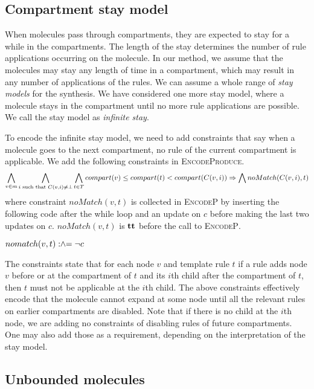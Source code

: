\subsection{Compartment stay model}

When molecules pass through compartments, they are expected to stay
for a while in the compartments.
%
The length of the stay determines the number of rule applications
occurring on the molecule.
%
In our method, we assume that the molecules may stay any length of time
in a compartment, which may result in any number of applications of the rules.
%
%
We can assume a whole range of {\em stay models} for the synthesis.
%
We have considered one more stay model, where a molecule stays
in the compartment until no more rule applications are possible.
%
We call the stay model as {\em infinite stay}.

To encode the infinite stay model, we need to add constraints that
say when a molecule goes to the next compartment, no rule of
the current compartment is applicable.
%
We add the following constraints in \textsc{EncodeProduce}.
$$
\bigwedge_{v\in m}\bigwedge_{i \text{ such that } C(v,i) \neq \bot}\bigwedge_{t \in T}
compart( v ) \leq compart(t) < compart(C(v,i)) 
\Rightarrow \bigwedge noMatch(C(v,i),t)
$$
where constraint $noMatch(v,t)$ is collected in \textsc{EncodeP}
by inserting the following code after the while loop and an update on $c$ before making the last two updates on $c$.
$noMatch(v,t)$ is $\mathbf{tt}$
before the call to \textsc{EncodeP}.
\begin{algorithmic}[1]
  \vspace{1ex}
  \State $nomatch(v,t) \mathrel{:\hspace{-3pt}\land\hspace{-3pt}=} \lnot c$
  \vspace{1ex}
\end{algorithmic}
The constraints state that for each node $v$ and template rule $t$
if a rule adds node $v$ before or at the compartment of $t$
and its $i$th child after the compartment of $t$,
then $t$ must not be applicable at the $i$th child.
The above constraints effectively encode that the molecule
cannot expand at some node until all the relevant rules on
earlier compartments are disabled.
Note that if there is no child at the $i$th node, we are adding no constraints of disabling rules of future compartments.
One may also add those as a requirement, depending on
the interpretation of the stay model.

\subsection{Unbounded molecules}

